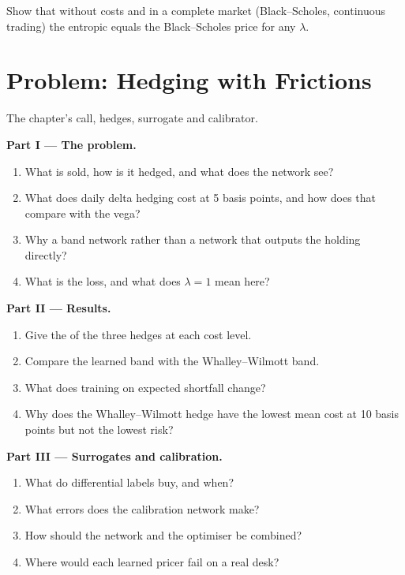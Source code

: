 \begin{exercise}[$\star\star\star$]\label{exo:ml:deep-hedging-and-machine-learning-in-pricing:8}
Show that without costs and in a complete market (Black--Scholes, continuous trading) the entropic  equals
the Black--Scholes price for any $\lambda$.
\end{exercise}

\section{Problem: Hedging with Frictions}

\begin{problem}\label{pb:ml:deep-hedging-and-machine-learning-in-pricing:1}
The chapter's call, hedges, surrogate and calibrator.

\medskip\noindent\textbf{Part I --- The problem.}
\begin{enumerate}
\item What is sold, how is it hedged, and what does the network see?
\item What does daily delta hedging cost at 5 basis points, and how does that compare with the vega?
\item Why a band network rather than a network that outputs the holding directly?
\item What is the loss, and what does $\lambda = 1$ mean here?
\end{enumerate}

\medskip\noindent\textbf{Part II --- Results.}
\begin{enumerate}[resume]
\item Give the  of the three hedges at each cost level.
\item Compare the learned band with the Whalley--Wilmott band.
\item What does training on expected shortfall change?
\item Why does the Whalley--Wilmott hedge have the lowest mean cost at 10 basis points but not the lowest risk?
\end{enumerate}

\medskip\noindent\textbf{Part III --- Surrogates and calibration.}
\begin{enumerate}[resume]
\item What do differential labels buy, and when?
\item What errors does the calibration network make?
\item How should the network and the optimiser be combined?
\item Where would each learned pricer fail on a real desk?
\end{enumerate}


\end{problem}
